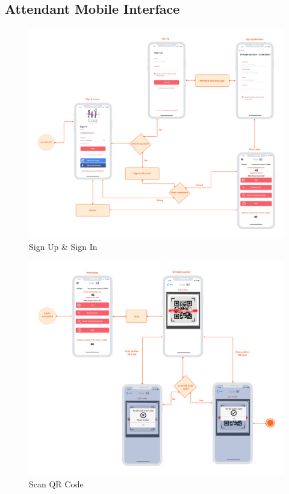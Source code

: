 \documentclass[table, 12pt]{article}
\begin{document}
\subsection{Attendant Mobile Interface}
\begin{center}
    \begin{figure}[H]
        \includegraphics[width=\textwidth]{assets/User-Interface-Design/sign_up_attendant.png}
        \caption{Sign Up \& Sign In}
    \end{figure}
\end{center}

\begin{center}
    \begin{figure}[H]
        \includegraphics[width=\textwidth]{assets/User-Interface-Design/scan_qr_attendant.png}
        \caption{Scan QR Code}
    \end{figure}
\end{center}
\end{document}
